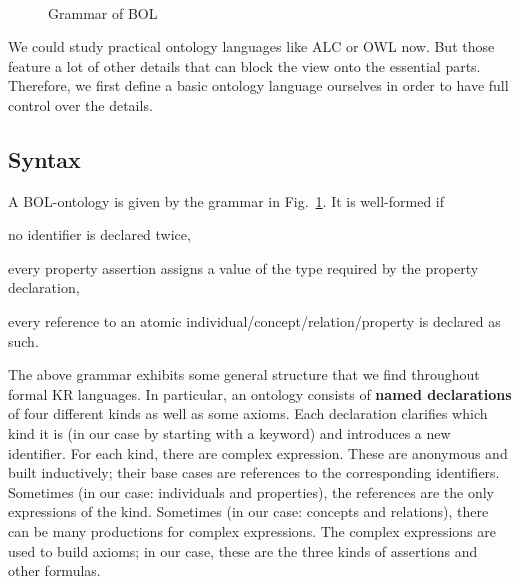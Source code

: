 \begin{figure}[hbt]
\begin{commgrammar}
\\
\\
\\
\\
\\
\\
\\
\\
\\
\\
\\
\end{commgrammar}
\caption{Grammar of BOL}\label{fig:bol}
\end{figure}

We could study practical ontology languages like ALC or OWL now.
But those feature a lot of other details that can block the view onto the essential parts.
Therefore, we first define a basic ontology language ourselves in order to have full control over the details.

\subsection{Syntax}

\begin{definition}
A BOL-ontology is given by the grammar in Fig.~\ref{fig:bol}.
It is well-formed if
\begin{compactitem}
 \item no identifier is declared twice,
 \item every property assertion assigns a value of the type required by the property declaration,
 \item every reference to an atomic individual/concept/relation/property is declared as such.
\end{compactitem}
\end{definition}



The above grammar exhibits some general structure that we find throughout formal KR languages.
In particular, an ontology consists of \textbf{named declarations} of four different kinds as well as some axioms.
Each declaration clarifies which kind it is (in our case by starting with a keyword) and introduces a new identifier.
For each kind, there are complex expression.
These are anonymous and built inductively; their base cases are references to the corresponding identifiers.
Sometimes (in our case: individuals and properties), the references are the only expressions of the kind.
Sometimes (in our case: concepts and relations), there can be many productions for complex expressions.
The complex expressions are used to build axioms; in our case, these are the three kinds of assertions and other formulas.

